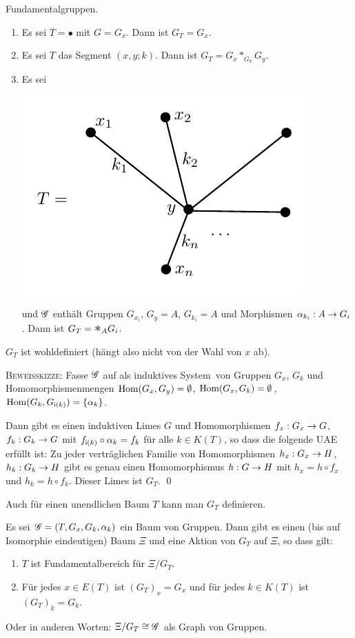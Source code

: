 \documentclass[a4paper, 12pt, twoside]{article}
\begin{document}
\BSP Fundamentalgruppen.
\begin{enumerate}
\item Es sei $T=\bullet$ mit $G=G_x$. Dann ist $G_T=G_x$.
\item Es sei $T$ das Segment $(x,y;k)$.
Dann ist $G_T=G_x *_{G_k} G_y$.
\item Es sei
\begin{center}
	\includegraphics{grugraImages/GT1}
\end{center}
und $\mathscr{G}$ enthält Gruppen $G_{x_i}$, $G_y=A$, $G_{k_i}=A$ und
Morphismen $\alpha_{k_i}:A\rightarrow G_i$.
Dann ist $G_T = \text{\Large$*$}_A G_i$.
\end{enumerate}

\BEM $G_T$ ist wohldefiniert (hängt also nicht von der Wahl von
$x$ ab).

\textsc{Beweisskizze:} Fasse $\mathscr{G}$ auf als \glqq induktives
System\grqq\
von Gruppen $G_x$, $G_k$ und Homomorphismenmengen $\mathrm{Hom}(G_x,G_y)=\emptyset$,
$\mathrm{Hom}(G_x,G_k)=\emptyset$, $\mathrm{Hom}(G_k,G_{\mathsf{i}(k)})=\{\alpha_k\}$.

Dann gibt es einen induktiven Limes $G$ und Homomorphismen
$f_x:G_x\rightarrow G$, $f_k:G_k\rightarrow G$ mit
$f_{\mathsf{i}(k)}\circ \alpha_k = f_k$ für alle $k\in K(T)$, so dass
die folgende UAE erfüllt ist: Zu jeder verträglichen Familie
von Homomorphismen $h_x:G_x\rightarrow H$, $h_k:G_k\rightarrow H$ gibt es genau einen
Homomorphismus $h:G\rightarrow H$ mit $h_x=h\circ f_x$ und $h_k=h\circ f_k$.
Dieser Limes ist $G_T$.
\qed

\FOLG Auch für einen unendlichen Baum $T$ kann man $G_T$ definieren.

\PROP\label{prop_BvG}
Es sei $\mathscr{G}=(T,G_x,G_k,\alpha_k)$ ein Baum von Gruppen.
Dann gibt es einen (bis auf Isomorphie eindeutigen) Baum $\Xi$
und eine Aktion von $G_T$ auf $\Xi$, so dass gilt:
\begin{enumerate}
\item $T$ ist Fundamentalbereich für $\Xi/G_T$.
\item Für jedes $x\in E(T)$ ist $(G_T)_x = G_x$ und für jedes
$k\in K(T)$ ist $(G_T)_k = G_k$.
\end{enumerate}
Oder in anderen Worten: $\Xi/G_T \cong \mathscr{G}$ als Graph von Gruppen.
\end{document}
